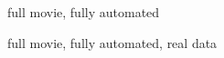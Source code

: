 
\newpage \begin{figure}[H]
\caption{full movie, fully automated} \label{fig:spatial_full}
\end{figure}

\newpage \begin{figure}[H]
\caption{full movie, fully automated, real data} \label{fig:spatial_full_data}
\end{figure}


